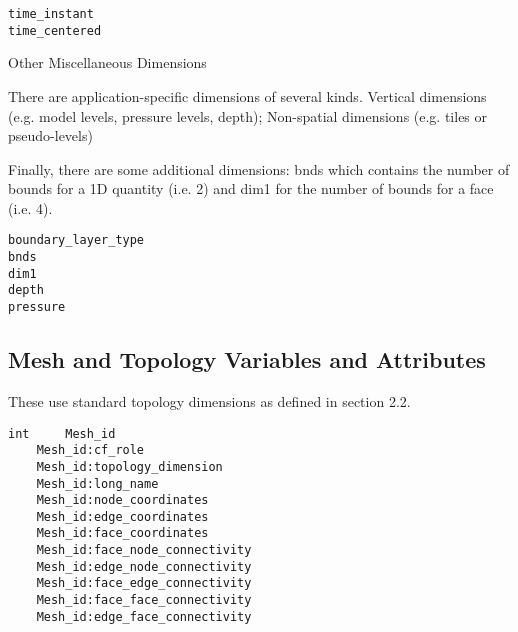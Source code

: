 
\begin{verbatim}
time_instant
time_centered
\end{verbatim}


Other Miscellaneous Dimensions

There are application-specific dimensions of several kinds. Vertical dimensions (e.g. model levels, pressure levels,
depth); Non-spatial dimensions (e.g. tiles or pseudo-levels)

Finally, there are some additional dimensions: bnds which contains the number of bounds for a 1D quantity (i.e. 2) and dim1 for the number of bounds for a face (i.e. 4).


\begin{verbatim}
boundary_layer_type
bnds
dim1
depth
pressure
\end{verbatim}

\subsection{Mesh and Topology Variables and Attributes}

These use standard topology dimensions as defined in section 2.2.

\begin{verbatim}
int     Mesh_id
    Mesh_id:cf_role
    Mesh_id:topology_dimension
    Mesh_id:long_name
    Mesh_id:node_coordinates
    Mesh_id:edge_coordinates
    Mesh_id:face_coordinates
    Mesh_id:face_node_connectivity
    Mesh_id:edge_node_connectivity
    Mesh_id:face_edge_connectivity
    Mesh_id:face_face_connectivity
    Mesh_id:edge_face_connectivity
\end{verbatim}

